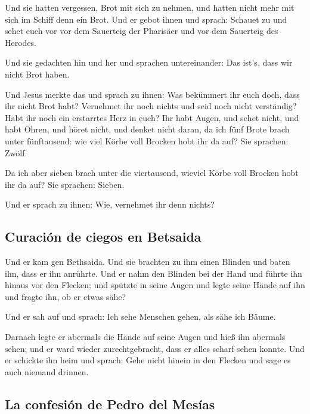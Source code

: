  Und sie hatten vergessen, Brot mit sich zu nehmen, und
hatten nicht mehr mit sich im Schiff denn ein Brot.  Und
er gebot ihnen und sprach: Schauet zu und sehet euch vor vor dem
Sauerteig der Pharisäer und vor dem Sauerteig des Herodes.

 Und sie gedachten hin und her und sprachen
untereinander: Das ist's, dass wir nicht Brot haben.

 Und Jesus merkte das und sprach zu ihnen: Was bekümmert
ihr euch doch, dass ihr nicht Brot habt? Vernehmet ihr noch nichts und
seid noch nicht verständig? Habt ihr noch ein erstarrtes Herz in euch?
 Ihr habt Augen, und sehet nicht, und habt Ohren, und
höret nicht, und denket nicht daran,  da ich fünf Brote
brach unter fünftausend: wie viel Körbe voll Brocken hobt ihr da auf?
Sie sprachen: Zwölf.

 Da ich aber sieben brach unter die viertausend, wieviel
Körbe voll Brocken hobt ihr da auf? Sie sprachen: Sieben.

 Und er sprach zu ihnen: Wie, vernehmet ihr denn nichts?

\hypertarget{curaciuxf3n-de-ciegos-en-betsaida}{%
\subsection{Curación de ciegos en
Betsaida}\label{curaciuxf3n-de-ciegos-en-betsaida}}

 Und er kam gen Bethsaida. Und sie brachten zu ihm einen
Blinden und baten ihn, dass er ihn anrührte.  Und er nahm
den Blinden bei der Hand und führte ihn hinaus vor den Flecken; und
spützte in seine Augen und legte seine Hände auf ihn und fragte ihn, ob
er etwas sähe?

 Und er sah auf und sprach: Ich sehe Menschen gehen, als
sähe ich Bäume.

 Darnach legte er abermals die Hände auf seine Augen und
hieß ihn abermals sehen; und er ward wieder zurechtgebracht, dass er
alles scharf sehen konnte.  Und er schickte ihn heim und
sprach: Gehe nicht hinein in den Flecken und sage es auch niemand
drinnen.

\hypertarget{la-confesiuxf3n-de-pedro-del-mesuxedas}{%
\subsection{La confesión de Pedro del
Mesías}\label{la-confesiuxf3n-de-pedro-del-mesuxedas}}

